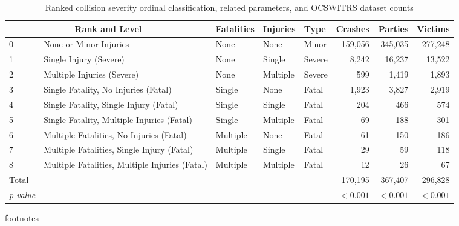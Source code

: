 \begin{table}[h]
\centering
\caption{Ranked collision severity ordinal classification, related parameters, and OCSWITRS dataset counts} 
\label{Tbl2}
\begin{tabular}{lllllrrr}
  \toprule
  \multicolumn{2}{c}{Rank and Level} & Fatalities & Injuries & Type & Crashes & Parties & Victims \\ 
 \midrule
0 & None or Minor Injuries & None & None & Minor & 159,056 & 345,035 & 277,248 \\ 
  1 & Single Injury (Severe) & None & Single & Severe & 8,242 & 16,237 & 13,522 \\ 
  2 & Multiple Injuries (Severe) & None & Multiple & Severe & 599 & 1,419 & 1,893 \\ 
  3 & Single Fatality, No Injuries (Fatal) & Single & None & Fatal & 1,923 & 3,827 & 2,919 \\ 
  4 & Single Fatality, Single Injury (Fatal) & Single & Single & Fatal & 204 & 466 & 574 \\ 
  5 & Single Fatality, Multiple Injuries (Fatal) & Single & Multiple & Fatal & 69 & 188 & 301 \\ 
  6 & Multiple Fatalities, No Injuries (Fatal) & Multiple & None & Fatal & 61 & 150 & 186 \\ 
  7 & Multiple Fatalities, Single Injury (Fatal) & Multiple & Single & Fatal & 29 & 59 & 118 \\ 
  8 & Multiple Fatalities, Multiple Injuries (Fatal) & Multiple & Multiple & Fatal & 12 & 26 & 67 \\ 
   \midrule 
Total &  &  &  &  & 170,195 & 367,407 & 296,828 \\ 
   \textit{p-value}\footnotemark[1] &  &  &  &  & $<0.001$ & $<0.001$ & $<0.001$ \\ 
 \bottomrule
\end{tabular}
\end{table}
footnotes \\ 
  \midrule
{} \\ 
   \bottomrule
